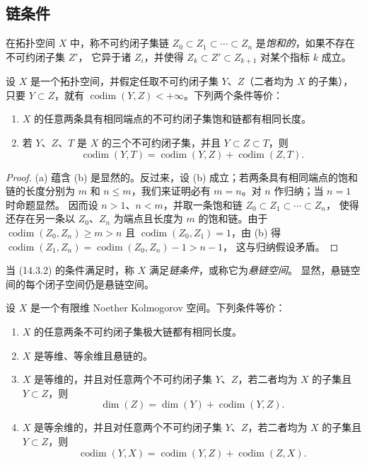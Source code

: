 \subsection{链条件}
\label{subsection:0.14.3-fr}

\begin{env}[14.3.1]
\label{0.14.3.1-fr}
在拓扑空间 $X$ 中，称不可约闭子集链
$Z_0\subset Z_1\subset\cdots\subset Z_n$ 是\emph{饱和的}，如果不存在不可约闭子集 $Z'$，
它异于诸 $Z_i$，并使得 $Z_k\subset Z'\subset Z_{k+1}$ 对某个指标 $k$ 成立。
\end{env}

\begin{proposition}[14.3.2]
\label{0.14.3.2-fr}
设 $X$ 是一个拓扑空间，并假定任取不可约闭子集 $Y$、$Z$（二者均为 $X$ 的子集），只要 $Y\subset Z$，就有
$\operatorname{codim}(Y,Z)<+\infty$。下列两个条件等价：
\begin{enumerate}
  \item[\rm(a)] $X$ 的任意两条具有相同端点的不可约闭子集饱和链都有相同长度。
  \item[\rm(b)] 若 $Y$、$Z$、$T$ 是 $X$ 的三个不可约闭子集，并且
  $Y\subset Z\subset T$，则
  \[
    \operatorname{codim}(Y,T)=
    \operatorname{codim}(Y,Z)+\operatorname{codim}(Z,T).
    \tag{14.3.2.1}\label{0.14.3.2.1-fr}
  \]
\end{enumerate}
\end{proposition}

\begin{proof}
(a) 蕴含 (b) 是显然的。反过来，设 (b) 成立；若两条具有相同端点的饱和链的长度分别为
$m$ 和 $n\leq m$，我们来证明必有 $m=n$。对 $n$ 作归纳；当 $n=1$ 时命题显然。
因而设 $n>1$、$n<m$，并取一条饱和链
$Z_0\subset Z_1\subset\cdots\subset Z_n$，
使得还存在另一条以
$Z_0$、$Z_n$ 为端点且长度为 $m$ 的饱和链。由于
$\operatorname{codim}(Z_0,Z_n)\geq m>n$ 且
$\operatorname{codim}(Z_0,Z_1)=1$，由 (b) 得
$\operatorname{codim}(Z_1,Z_n)=\operatorname{codim}(Z_0,Z_n)-1>n-1$，
这与归纳假设矛盾。
\end{proof}

当 (14.3.2) 的条件满足时，称 $X$ 满足\emph{链条件}，或称它为\emph{悬链空间}。
显然，悬链空间的每个闭子空间仍是悬链空间。

\begin{proposition}[14.3.3]
\label{0.14.3.3-fr}
设 $X$ 是一个有限维 Noether Kolmogorov 空间。下列条件等价：
\begin{enumerate}
  \item[\rm(a)] $X$ 的任意两条不可约闭子集极大链都有相同长度。
  \item[\rm(b)] $X$ 是等维、等余维且悬链的。
  \item[\rm(c)] $X$ 是等维的，并且对任意两个不可约闭子集 $Y$、$Z$，若二者均为 $X$ 的子集且 $Y\subset Z$，则
  \[
    \dim(Z)=\dim(Y)+\operatorname{codim}(Y,Z).
    \tag{14.3.3.1}\label{0.14.3.3.1-fr}
  \]
  \item[\rm(d)] $X$ 是等余维的，并且对任意两个不可约闭子集 $Y$、$Z$，若二者均为 $X$ 的子集且 $Y\subset Z$，则
  \[
    \operatorname{codim}(Y,X)=
    \operatorname{codim}(Y,Z)+\operatorname{codim}(Z,X).
    \tag{14.3.3.2}\label{0.14.3.3.2-fr}
  \]
\end{enumerate}
\end{proposition}

